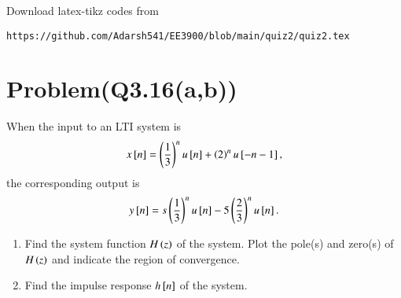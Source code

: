 \documentclass[journal,12pt,twocolumn]{IEEEtran}
\begin{document}
%
Download latex-tikz codes from 
%
\begin{lstlisting}
https://github.com/Adarsh541/EE3900/blob/main/quiz2/quiz2.tex
\end{lstlisting}
\section{Problem(Q3.16(a,b))}
When the input to an LTI system is 
\begin{align}
    x{}\left[n\right]=\left(\frac{1}{3}\right)^nu{}\left[n\right]+\left(2\right)^nu{}\left[-n-1\right],
\end{align}
the corresponding output is 
\begin{align}
    y{}\left[n\right]=s\left(\frac{1}{3}\right)^nu{}\left[n\right]-5\left(\frac{2}{3}\right)^nu{}\left[n\right].
\end{align}
\begin{enumerate}
    \item Find the system function $H\left(z\right)$ of the system. Plot the pole(s) and zero(s) of $H\left(z\right)$ and indicate the region of convergence.
    \item Find the impulse response $h{}\left[n\right]$ of the system.
\end{enumerate}
\end{document}
